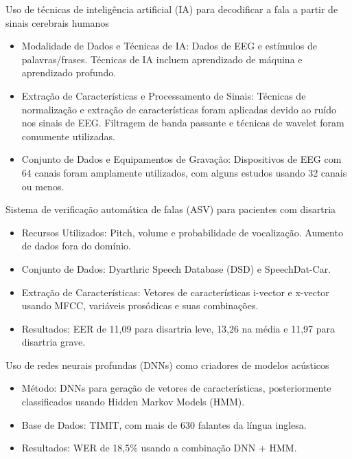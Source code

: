 \documentclass[aspectratio=169]{beamer}
\begin{document}
	\begin{frame}{Uso de técnicas de inteligência artificial (IA) para decodificar a fala a partir de sinais cerebrais humanos \cite{WOS:000857544900001}}
		\begin{itemize}
			\item Modalidade de Dados e Técnicas de IA: Dados de EEG e estímulos de palavras/frases. Técnicas de IA incluem aprendizado de máquina e aprendizado profundo.
			\item Extração de Características e Processamento de Sinais: Técnicas de normalização e extração de características foram aplicadas devido ao ruído nos sinais de EEG. Filtragem de banda passante e técnicas de wavelet foram comumente utilizadas.
			\item Conjunto de Dados e Equipamentos de Gravação: Dispositivos de EEG com 64 canais foram amplamente utilizados, com alguns estudos usando 32 canais ou menos.
		\end{itemize}
		
	\end{frame}
	
	\begin{frame}{Sistema de verificação automática de falas (ASV) para pacientes com disartria \cite{salim2023automatic}}
		\begin{itemize}
			\item Recursos Utilizados: Pitch, volume e probabilidade de vocalização. Aumento de dados fora do domínio.
			\item Conjunto de Dados: Dyarthric Speech Database (DSD) e SpeechDat-Car.
			\item Extração de Características: Vetores de características i-vector e x-vector usando MFCC, variáveis prosódicas e suas combinações.
			\item Resultados: EER de 11,09 para disartria leve, 13,26 na média e 11,97 para disartria grave.
		\end{itemize}
		
	\end{frame}

	\begin{frame}{Uso de redes neurais profundas (DNNs) como criadores de modelos acústicos \cite{6296526}}
		\begin{itemize}
			\item Método: DNNs para geração de vetores de características, posteriormente classificados usando Hidden Markov Models (HMM).
			\item Base de Dados: TIMIT, com mais de 630 falantes da língua inglesa.
			\item Resultados: WER de 18,5\% usando a combinação DNN + HMM.
		\end{itemize}
		
	\end{frame}
	
\end{document}
